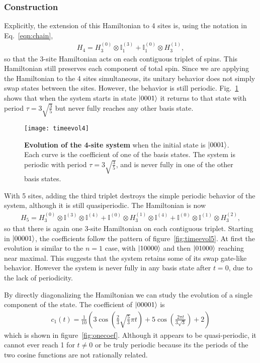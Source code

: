 \subsubsection{Construction} \label{subsub:construction} 

Explicitly, the extension of this Hamiltonian to 4 sites is, using the notation in Eq.~\ref{eqn:chain},
\begin{align}
H_4 = H_3^{(0)}\otimes\mathbb{I}_1^{(3)} + \mathbb{I}_1^{(0)}\otimes H_3^{(1)},
\end{align}
so that the 3-site Hamiltonian acts on each contiguous triplet of spins.
This Hamiltonian still preserves each component of total spin. Since we are applying the Hamiltonian to the 4 sites simultaneous, its unitary behavior does not simply swap states between the sites. However, the behavior is still periodic. Fig.~\ref{fig:timeevol4} shows that when the system starts in state $\left|0001\right\rangle$ it returns to that state with period $\tau=3\sqrt{\frac{3}{5}}$ but never fully reaches any other basis state.
\begin{figure}
\centering
\texttt{[image: timeevol4]}
\caption{\textbf{Evolution of the 4-site system} when the initial state is $\left|0001\right\rangle$. Each curve is the coefficient of one of the basis states. The system is periodic with period $\tau=3\sqrt{\frac{3}{5}}$, and is never fully in one of the other basis states.}
\label{fig:timeevol4}
\end{figure}

With 5 sites, adding the third triplet destroys the simple periodic behavior of the system, although it is still quasiperiodic. The Hamiltonian is now
\begin{align}
H_5 = H_3^{(0)}\otimes\mathbb{I}^{(3)}\otimes\mathbb{I}^{(4)} + 
	\mathbb{I}^{(0)}\otimes H_3^{(1)}\otimes\mathbb{I}^{(4)} +
	\mathbb{I}^{(0)}\otimes\mathbb{I}^{(1)}\otimes H_3^{(2)},
\end{align} 
so that there is again one 3-site Hamiltonian on each contiguous triplet.
Starting in $\left|00001\right\rangle$, the coefficients follow the pattern of figure~\ref{fig:timeevol5}. At first the evolution is similar to the $n=1$ case, with $\left|10000\right\rangle$ and then $\left|01000\right\rangle$ reaching near maximal. This suggests that the system retains some of its swap gate-like behavior. However the system is never fully in any basis state after $t=0$, due to the lack of periodicity.

By directly diagonalizing the Hamiltonian we can study the evolution of a single component of the state. The coefficient of $\left|00001\right\rangle$ is 
\begin{align}
c_1(t) = \frac{1}{10} \left(3 \cos \left(\frac{2}{3} \sqrt{\frac{5}{3}} \pi  t\right)+5 \cos \left(\frac{2 \pi  t}{3 \sqrt{3}}\right)+2\right)
\end{align} 
which is shown in figure~\ref{fig:onecoef}. Although it appears to be quasi-periodic, it cannot ever reach 1 for $t\ne 0$ or be truly periodic because its the periods of the two cosine functions are not rationally related.

